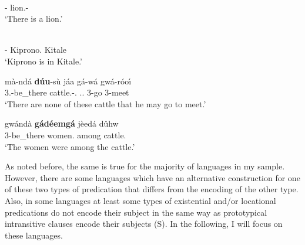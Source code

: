 \begin{exe}\ex\label{NanExist} %
\begin{xlist}
\ex\gll{} \\
\cop{}-\ipfv{} lion.\nom{}-\them{}\\
\glt `There is a lion.' %

\ex\gll{}  \\
\cop{}-\ipfv{} Kiprono.\nom{} Kitale\\
\glt `Kiprono is in Kitale.'
\end{xlist}
\end{exe}

\begin{exe}\ex\label{DatExist}
\begin{xlist} 
\ex\gll m\`a-nd\'a \textbf{d\'uu}-s\`u j\'aa g\'a-w\'a gw\'a-r\'oo\textltailn \'\i\\
3.\Neg{}-be\_there cattle.\nom{}-\prox{}.\pl{} \nom{}.\fut{}.\relativ{} 3-go 3-meet\\
\glt `There are none of these cattle that he may go to meet.'

\ex\gll gw\'and\`a \textbf{g\'ad\'eemg\'a} j\`eed\'a d\^uhw\\
3-be\_there women.\nom{} among cattle.\acc{}\\
\glt `The women were among the cattle.'
\end{xlist}
\end{exe}

As noted before, the same is true for the majority of languages in my sample. 
However, there are some languages which have an alternative construction for one of these two types of predication that differs from the encoding of the other type. 
Also, in some languages at least some types of existential and/or locational predications do not encode their subject in the same way as prototypical intransitive clauses encode their subjects (S). 
In the following, I will focus on these languages.   

